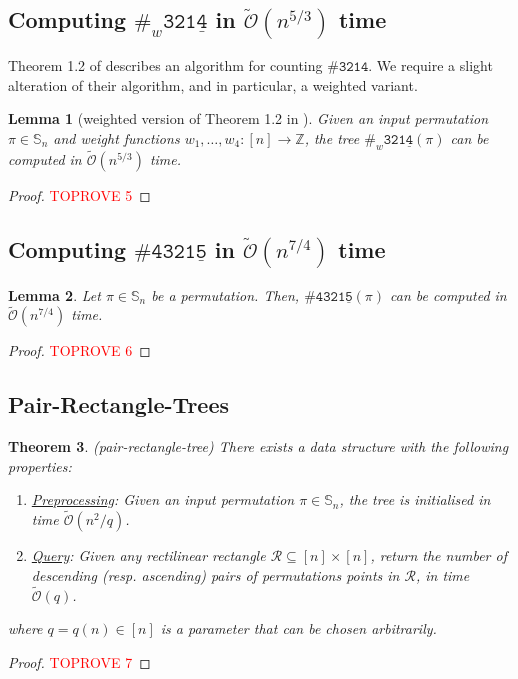 \documentclass{article}
\newtheorem{theorem}{Theorem}[section]
\newtheorem{lemma}[theorem]{Lemma}
\newcommand{\Sn}{\mathbb{S}_n}
\newcommand{\ZZ}{\mathbb{Z}}
\newcommand{\pc}[2]{{\# \mathtt{ #1 } \left( #2 \right)}}
\newcommand{\pce}[1]{{\# \mathtt{#1} }}
\newcommand{\pcw}[2]{{\#_w \mathtt{ #1 } \left( #2 \right)}}
\newcommand{\pcwe}[1]{{\#_w \mathtt{ #1 } }}
\theoremstyle{remark}
\newcommand{\Otilde}[1]{\widetilde{\mathcal{O}}\left( #1 \right)}
\theoremstyle{plain}
\begin{document}
\subsection{Computing \texorpdfstring{$\pcwe{321\underline{4}}$}{\# 3214} in \texorpdfstring{$\Otilde{n^{5/3}}$}{O(n 5/3)} time}
\label{subsect:3214_gadget}

Theorem 1.2 of \cite{even2021counting} describes an algorithm for counting $\pce{3214}$. 
We require a slight alteration of their algorithm, and in particular, a weighted variant.

\begin{lemma} [weighted version of Theorem 1.2 in \cite{even2021counting}]
    Given an input permutation $\pi \in\Sn$ and weight functions $w_1,\ldots,w_4:[n]\to\ZZ$, the tree $\pcw{321\underline{4}}{\pi}$ can be computed in $\Otilde{n^{5/3}}$ time.
\end{lemma}
\begin{proof}\textcolor{red}{TOPROVE 5}\end{proof}

\subsection{Computing \texorpdfstring{$\pce{4321\underline{5}}$}{\# 43215} in \texorpdfstring{$\Otilde{n^{7/4}}$}{O(n 7/4)} time}
\label{subsect:43215_gadget}

\begin{lemma}
    \label{lemma:fast_43215}
    Let $\pi\in\Sn$ be a permutation. Then, $\pc{4321\underline{5}}{\pi}$ can be computed in $\Otilde{n^{7/4}}$ time.
\end{lemma}
\begin{proof}\textcolor{red}{TOPROVE 6}\end{proof}

\subsection{Pair-Rectangle-Trees}
\label{subsect:pair_rect_trees}

\begin{theorem}(pair-rectangle-tree)
    \label{thm:pair_rect_tree}
    There exists a data structure with the following properties:
    \begin{enumerate}
        \item \underline{Preprocessing}: Given an input permutation $\pi \in \Sn$, the tree is initialised in time $\Otilde{n^2 / q}$.
        \item \underline{Query}: Given any rectilinear rectangle $\mathcal{R} \subseteq [n] \times [n]$, return the number of descending (resp. ascending) pairs of permutations points in $\mathcal{R}$, in time $\Otilde{q}$.
    \end{enumerate}
    where $q=q(n) \in [n]$ is a parameter that can be chosen arbitrarily. 
\end{theorem}
\begin{proof}\textcolor{red}{TOPROVE 7}\end{proof}
\end{document}
